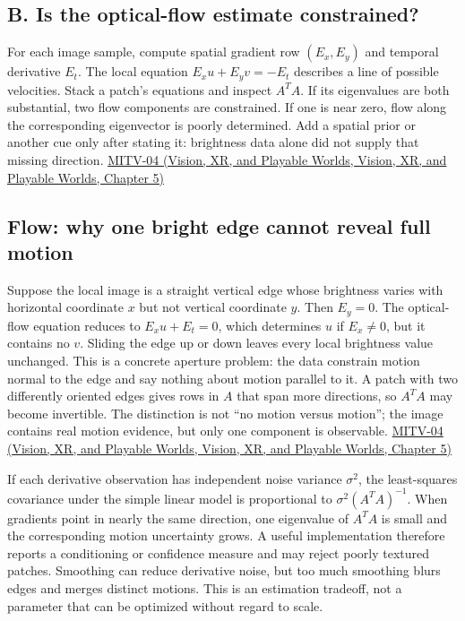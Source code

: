 \subsection{B. Is the optical-flow estimate constrained?}\label{04-visual-computing-ii-ch030-b.-is-the-optical-flow-estimate-constrained}

For each image sample, compute spatial gradient row \((E_x,E_y)\) and temporal derivative \(E_t\). The local equation \(E_xu+E_yv=-E_t\) describes a line of possible velocities. Stack a patch's equations and inspect \(A^TA\). If its eigenvalues are both substantial, two flow components are constrained. If one is near zero, flow along the corresponding eigenvector is poorly determined. Add a spatial prior or another cue only after stating it: brightness data alone did not supply that missing direction. \href{../07-Vision-XR-and-Playable-Worlds/main.pdf\#nameddest=04-visual-computing-ii-ch036-mitv-04---fixed-optical-flow-optical-mouse-constant-brightness-assumption-closed-form-solution}{MITV-04 (Vision, XR, and Playable Worlds, Vision, XR, and Playable Worlds, Chapter 5)}

\subsection{Flow: why one bright edge cannot reveal full motion}\label{04-visual-computing-ii-ch030-flow-why-one-bright-edge-cannot-reveal-full-motion}

Suppose the local image is a straight vertical edge whose brightness varies with horizontal coordinate \(x\) but not vertical coordinate \(y\). Then \(E_y=0\). The optical-flow equation reduces to \(E_xu+E_t=0\), which determines \(u\) if \(E_x\ne0\), but it contains no \(v\). Sliding the edge up or down leaves every local brightness value unchanged. This is a concrete aperture problem: the data constrain motion normal to the edge and say nothing about motion parallel to it. A patch with two differently oriented edges gives rows in \(A\) that span more directions, so \(A^TA\) may become invertible. The distinction is not ``no motion versus motion''; the image contains real motion evidence, but only one component is observable. \href{../07-Vision-XR-and-Playable-Worlds/main.pdf\#nameddest=04-visual-computing-ii-ch036-mitv-04---fixed-optical-flow-optical-mouse-constant-brightness-assumption-closed-form-solution}{MITV-04 (Vision, XR, and Playable Worlds, Vision, XR, and Playable Worlds, Chapter 5)}

If each derivative observation has independent noise variance \(\sigma^2\), the least-squares covariance under the simple linear model is proportional to \(\sigma^2(A^TA)^{-1}\). When gradients point in nearly the same direction, one eigenvalue of \(A^TA\) is small and the corresponding motion uncertainty grows. A useful implementation therefore reports a conditioning or confidence measure and may reject poorly textured patches. Smoothing can reduce derivative noise, but too much smoothing blurs edges and merges distinct motions. This is an estimation tradeoff, not a parameter that can be optimized without regard to scale.

